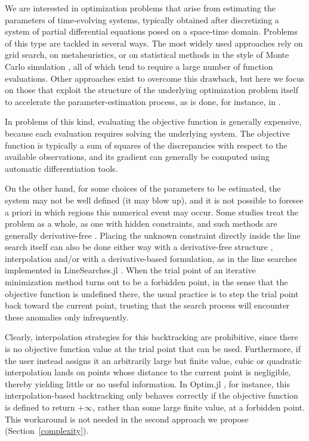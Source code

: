 \documentclass{article}
\begin{document}
We are interested in optimization problems that arise from estimating the
parameters of time-evolving systems, typically obtained after
discretizing a system of partial differential equations posed on a
space-time domain. Problems of this type are tackled in several ways.
The most widely used approaches rely on grid search, on metaheuristics,
or on statistical methods in the style of Monte Carlo simulation
\cite{Agresta2021,Hosseiny2022,Kang2024}, all of which tend to require
a large number of function evaluations. Other approaches exist to overcome this drawback,
but here we focus on those that exploit the structure of the underlying
optimization problem itself to accelerate the parameter-estimation
process, as is done, for instance, in \cite{BirginMartinez2022,FortunatoMartinez2025,Nguyen2016}.

In problems of this kind, evaluating the objective function is generally expensive, because each evaluation requires
 solving the underlying system. The objective function is typically a sum of squares of the discrepancies with respect to
 the available observations, and its gradient can generally be computed using automatic differentiation tools.

On the other hand, for some choices of the parameters to be estimated, the system may not be well defined (it may blow up), and it is
 not possible to foresee a priori in which regions this numerical event may occur. Some studies treat the problem as a whole, as
 one with hidden constraints, and such methods are generally derivative-free
 \cite{mads,audetdennis,bcls,csvbook,gllt,LeDigabelWild2024,rz}.
 Placing the unknown constraint directly inside the line search itself can also be done either way with a derivative-free
 structure \cite{fllr,GrattonVicente2014}, interpolation and/or with a derivative-based formulation, as in the line searches implemented in
 LineSearches.jl \cite{Mogensen2018}. When the trial point of an iterative
minimization method turns out to be a forbidden point, in the sense that the objective function is undefined there, the usual
practice is to step the trial point back toward the current point, trusting that the search process will encounter these
anomalies only infrequently.

Clearly, interpolation strategies for this backtracking are prohibitive, since there is no objective function value at the trial
 point that can be used. Furthermore, if the user instead assigns it an arbitrarily large but finite value, cubic or quadratic
 interpolation lands on points whose distance to the current point is negligible, thereby yielding little or no useful
 information. In Optim.jl \cite{Mogensen2018}, for instance, this interpolation-based backtracking only behaves correctly if the
 objective function is defined to return $+\infty$, rather than some large finite value, at a forbidden point. This workaround
 is not needed in the second approach we propose (Section~\ref{complexity}).
\end{document}
